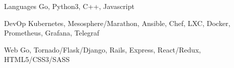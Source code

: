 

\begin{cvskills}

  \cvskill
    {Languages} %
    {Go, Python3, C++, Javascript} %

  \cvskill
    {DevOp} %
    {Kubernetes, Mesosphere/Marathon, Ansible, Chef, LXC, Docker, Prometheus, Grafana, Telegraf} %

  \cvskill
    {Web} %
    {Go, Tornado/Flask/Django, Rails, Express, React/Redux, HTML5/CSS3/SASS} %

\end{cvskills}
